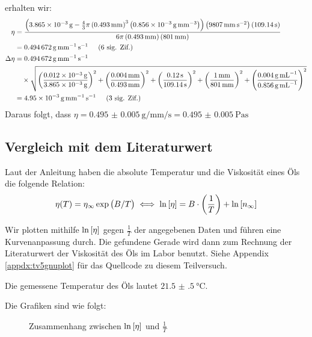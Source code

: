 		erhalten wir:
		\begin{align}
			\eta &= \frac{\left(\SI{3.865e-3}{\gram} - \frac{4}{3}\pi \left(\SI{0.493}{\milli\meter}\right)^3 \left(\SI{0,856e-3}{\gram\per\milli\meter\cubed}\right)\right)\left(\SI{9807}{\milli\meter\per\second\squared}\right)\left(\SI{109.14}{\second}\right)}{6\pi \left(\SI{0.493}{\milli\meter}\right) \left(\SI{801}{\milli\meter}\right)} \notag \\
			&= \SI{0.494672}{\gram\per\milli\meter\per\second} \hspace{0.5cm}\text{(6 sig. Zif.)}\\
			\Delta \eta &= \SI{0.494672}{\gram\per\milli\meter\per\second} \notag \\
			&~~~\times \sqrt{\left(\frac{\SI{0.012e-3}{\gram}}{\SI{3.865e-3}{\gram}}\right)^2 + \left(\frac{\SI{0.004}{\milli\meter}}{\SI{0.493}{\milli\meter}}\right)^2 + \left(\frac{\SI{0.12}{\second}}{\SI{109.14}{\second}}\right)^2 + \left(\frac{\SI{1}{\milli\meter}}{\SI{801}{\milli\meter}}\right)^2 + \left(\frac{\SI{0.004}{\gram\per\milli\liter}}{\SI{0.856}{\gram\per\milli\liter}}\right)^2} \notag \\
			&= \SI{4.95e-3}{\gram\per\milli\meter\per\second} \hspace{0.5cm}\text{(3 sig. Zif.)}
		\end{align}
		Daraus folgt, dass $\eta = \SI{0.495(5)}{\gram\per\milli\meter\per\second} = \SI{0.495(5)}{\pascal\second}$

	\newpage
	\subsection{Vergleich mit dem Literaturwert}
		Laut der Anleitung haben die absolute Temperatur und die Viskosität eines Öls die folgende Relation:
		\begin{equation}
			\eta(T) = \eta_\infty\exp\left(B/T\right) \iff \ln\left[\eta\right] = B\cdot\left(\frac{1}{T}\right) + \ln\left[n_\infty\right]
		\end{equation}

		Wir plotten mithilfe \gnuplot{} $\ln\left[\eta\right]$ gegen $\frac{1}{T}$ der angegebenen Daten und führen eine Kurvenanpassung durch. Die gefundene Gerade wird dann zum Rechnung der Literaturwert der Viskosität des Öls im Labor benutzt. Siehe Appendix \ref{appdx:tv5gnuplot} für das Quellcode zu diesem Teilversuch.

		Die gemessene Temperatur des Öls lautet $\SI{21.5(5)}{\celsius}$.

		Die Grafiken sind wie folgt:

		\begin{figure}[H]
			\centering
			
			\caption{Zusammenhang zwischen $\ln\left[\eta\right]$ und $\frac{1}{T}$}
			\label{fig:tvfive-plot}
		\end{figure}

